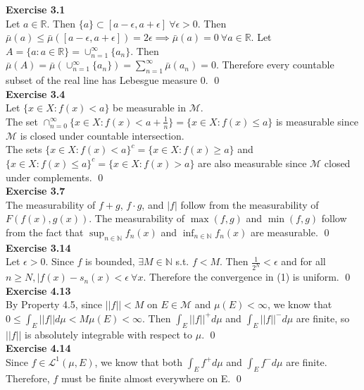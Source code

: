 \documentclass[letterpaper,12pt]{article}
\theoremstyle{definition}
\begin{document}
\textbf{Exercise 3.1} \\
Let $a \in \mathbb{R}$. Then $\{a\} \subset [a - \epsilon, a + \epsilon] \ \forall \epsilon > 0$. Then $\bar{\mu}(a) \leq \bar{\mu} ([a - \epsilon, a + \epsilon]) = 2 \epsilon \implies \bar{\mu}(a) = 0 \ \forall a \in \mathbb{R}$. Let $A = \{a: a \in \mathbb{R}\} = \cup_{n=1}^\infty \{a_n\}$. Then $\bar{\mu}(A) = \bar{\mu}(\cup_{n=1}^\infty \{a_n\}) = \sum_{n=1}^\infty \bar{\mu}(a_n) = 0$. Therefore every countable subset of the real line has Lebesgue measure 0. \qed \\

\textbf{Exercise 3.4} \\
Let $\{x \in X: f(x) < a\}$ be measurable in $\mathcal{M}$. \\
The set $\cap_{n=0}^\infty \{x \in X: f(x) < a + \frac{1}{n}\} = \{x \in X: f(x) \leq a\}$ is measurable since $\mathcal{M}$ is closed under countable intersection. \\
The sets $\{x \in X: f(x) < a\}^c = \{x \in X: f(x) \geq a\}$ and $\{x \in X: f(x) \leq a\}^c = \{x \in X: f(x) > a\}$ are also measurable since $\mathcal{M}$ closed under complements. \qed \\

\textbf{Exercise 3.7} \\
The measurability of $f + g$, $f \cdot g$, and $|f|$ follow from the measurability of $F(f(x), g(x))$. The measurability of $\max(f,g)$ and $\min(f,g)$ follow from the fact that $\sup_{n \in \mathbb{N}} f_n(x)$ and $\inf_{n \in \mathbb{N}} f_n(x)$ are measurable. \qed \\

\textbf{Exercise 3.14} \\
Let $\epsilon > 0$. Since $f$ is bounded, $\exists M \in \mathbb{N}$ s.t. $f < M$. Then $\frac{1}{2^N} < \epsilon$ and for all $n \geq N, |f(x) - s_n(x) < \epsilon \ \forall x$. Therefore the convergence in (1) is uniform. \qed \\

\textbf{Exercise 4.13} \\
By Property 4.5, since $||f|| < M$ on $E \in \mathcal{M}$ and $\mu(E) < \infty$, we know that $0 \leq \int_E ||f|| d\mu < M\mu(E) < \infty$. Then $\int_E ||f||^+ d\mu$ and $\int_E ||f||^- d\mu$ are finite, so $||f||$ is absolutely integrable with respect to $\mu$. \qed \\

\textbf{Exercise 4.14} \\
Since $f \in \mathscr{L}^1(\mu, E)$, we know that both $\int_E f^+ d\mu$ and $\int_E f^- d\mu$ are finite. Therefore, $f$ must be finite almost everywhere on E. \qed \\
\end{document}
